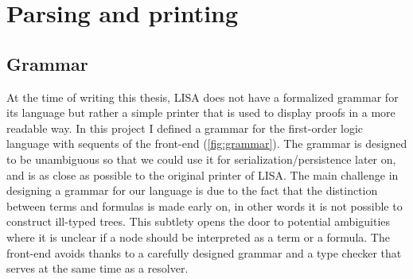 \section{Parsing and printing}
\label{sec:parsing-printing}

\subsection{Grammar}

At the time of writing this thesis, LISA does not have a formalized grammar for its language but rather a simple printer that is used to display proofs in a more readable way. In this project I defined a grammar for the first-order logic language with sequents of the front-end (\autoref{fig:grammar}). The grammar is designed to be unambiguous so that we could use it for serialization/persistence later on, and is as close as possible to the original printer of LISA. The main challenge in designing a grammar for our language is due to the fact that the distinction between terms and formulas is made early on, in other words it is not possible to construct ill-typed trees. This subtlety opens the door to potential ambiguities where it is unclear if a node should be interpreted as a term or a formula. The front-end avoids thanks to a carefully designed grammar and a type checker that serves at the same time as a resolver.

